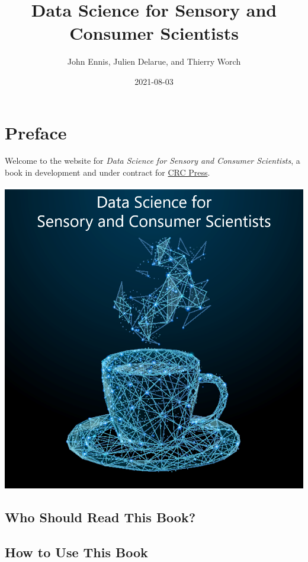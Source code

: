 \documentclass[
]{book}
\title{Data Science for Sensory and Consumer Scientists}
\author{John Ennis, Julien Delarue, and Thierry Worch}
\date{2021-08-03}
\begin{document}
\maketitle

{
\setcounter{tocdepth}{1}
\tableofcontents
}
\hypertarget{preface}{%
\chapter*{Preface}\label{preface}}

Welcome to the website for \emph{Data Science for Sensory and Consumer Scientists}, a book in development and under contract for \href{https://www.routledge.com/}{CRC Press}.

\begin{center}\includegraphics[width=13.44in]{images/cover_art} \end{center}

\hypertarget{who-should-read-this-book}{%
\section*{Who Should Read This Book?}\label{who-should-read-this-book}}

\hypertarget{how-to-use-this-book}{%
\section*{How to Use This Book}\label{how-to-use-this-book}}
\end{document}
